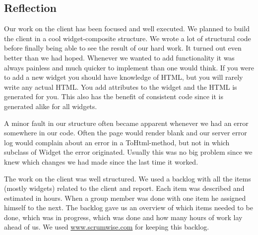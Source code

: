 \subsection{Reflection}

Our work on the client has been focused and well executed. We planned to build the client in a cool widget-composite structure. We wrote a lot of structural code before finally being able to see the result of our hard work. It turned out even better than we had hoped. Whenever we wanted to add functionality it was always painless and much quicker to implement than one would think. If you were to add a new widget you should have knowledge of HTML, but you will rarely write any actual HTML. You add attributes to the widget and the HTML is generated for you. This also has the benefit of consistent code since it is generated alike for all widgets.

A minor fault in our structure often became apparent whenever we had an error somewhere in our code. Often the page would render blank and our server error log would complain about an error in a ToHtml-method, but not in which subclass of Widget the error originated. Usually this was no big problem since we knew which changes we had made since the last time it worked.

The work on the client was well structured. We used a backlog with all the items (mostly widgets) related to the client and report. Each item was described and estimated in hours. When a group member was done with one item he assigned himself to the next. The backlog gave us an overview of which items needed to be done, which was in progress, which was done and how many hours of work lay ahead of us. We used \url{www.scrumwise.com} for keeping this backlog.
\newpage